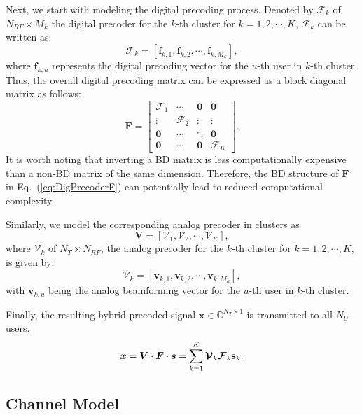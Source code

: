 \documentclass[conference]{IEEEtran}
\begin{document}
{Next, we start with modeling the digital precoding process. Denoted by $\bm{\mathcal{F}}_k$ of $N_{RF}\times M_k$ the digital precoder for the $k$-th cluster for $k=1,2,\cdots, K$, $\bm{\mathcal{F}}_k$ can be written as:
\begin{equation}
\bm{\mathcal{F}}_k = \left[\bm{f}_{k,1},\bm{f}_{k,2},\cdots,\bm{f}_{k,M_k}\right],
\end{equation}
where $\bm{f}_{k,u}$ represents the digital precoding vector for the $u$-th user in $k$-th cluster. Thus, the overall digital precoding matrix can be expressed as a block diagonal matrix as follows:
\begin{equation}
\bm{F} =
\begin{bmatrix}
\bm{\mathcal{F}}_1&\cdots & \bm{0}&\bm{0}\\
\vdots & \bm{\mathcal{F}}_2 & \vdots&\vdots \\
\bm{0}&\cdots&\ddots &\bm{0}\\
\bm{0}&\cdots & \bm{0}&\bm{\mathcal{F}}_K
\end{bmatrix}.\label{eq:DigPrecoderF}
\end{equation}
It is worth noting that inverting a BD matrix is less computationally
expensive than a non-BD matrix of the same dimension. Therefore, the BD structure of $\bm{F}$ in Eq.~(\ref{eq:DigPrecoderF}) can potentially lead to reduced computational complexity.

Similarly, we model the corresponding analog precoder in clusters as
\begin{equation}
	\bm{V} = \left[\bm{\mathcal{V}}_1, \bm{\mathcal{V}}_2,\cdots, \bm{\mathcal{V}}_{K}\right], \end{equation}
where $\bm{\mathcal{V}}_k$ of $N_T\times N_{RF}$, the analog precoder for the $k$-th cluster for $k=1,2,\cdots, K$, is given by:
\begin{equation}
\bm{\mathcal{V}}_k = \left[\bm{v}_{k,1},\bm{v}_{k,2},\cdots,\bm{v}_{k,M_k}\right],
\end{equation}
with $\bm{v}_{k,u}$ being the analog beamforming vector for the $u$-th user in $k$-th cluster.

Finally, the resulting hybrid precoded signal $\bm x \in\mathbb{C}^{N_T\times 1}$ is transmitted to all $N_U$ users.
\begin{equation}{\label{eq:transx}}
{\bm x} =  \bm{V}\cdot \bm{F}\cdot\bm{s} =\sum_{k=1}^K \bm{\mathcal{V}}_k \bm{\mathcal{F}}_k \mathbf{s}_k.
\end{equation}


\subsection{Channel Model}

}
\end{document}
